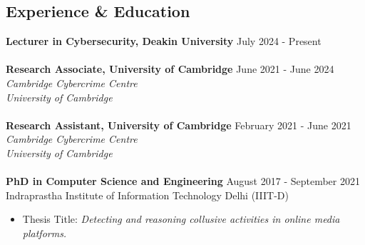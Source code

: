 \documentclass[margin, centered]{res}
\begin{document}
\begin{resume}
\section{Experience \& Education}
\textbf{Lecturer in Cybersecurity, Deakin University} \hfill July 2024 - Present\\ \\ [-2mm]
\textbf{Research Associate, University of Cambridge} \hfill June 2021 - June 2024\\
\emph{Cambridge Cybercrime Centre \\
University of Cambridge
} \\
\\ [-2mm]
\textbf{Research Assistant, University of Cambridge} \hfill February 2021 - June 2021\\
\emph{Cambridge Cybercrime Centre \\
University of Cambridge
} \\\\ [-2mm]
\textbf{PhD in Computer Science and Engineering} \hfill August 2017 - September 2021 \\
Indraprastha Institute of Information Technology Delhi (IIIT-D)
\begin{itemize}
 \item Thesis Title: \textit{Detecting and reasoning collusive activities in online media platforms.}
\end{itemize}


\end{resume}
\end{document}
